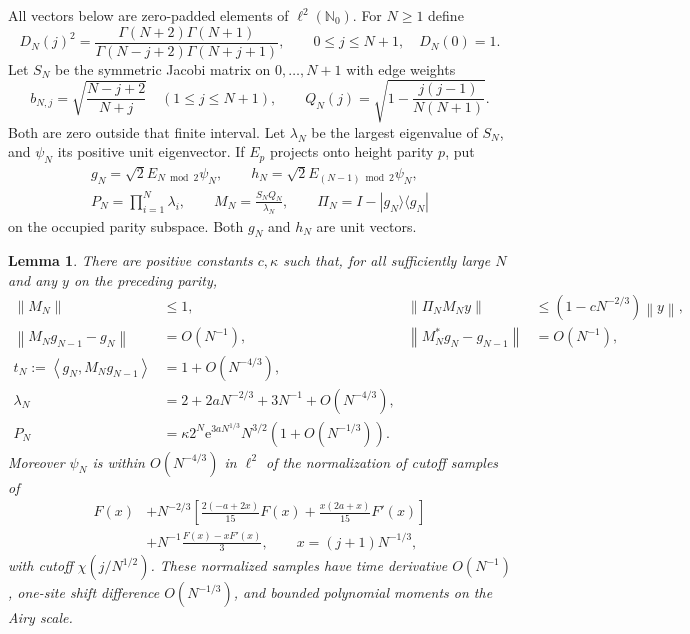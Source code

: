 \documentclass[11pt,letterpaper]{article}
\numberwithin{equation}{section}
\newtheorem{lemma}[theorem]{Lemma}
\theoremstyle{remark}
\newcommand{\norm}[1]{\left\lVert#1\right\rVert}
\newcommand{\ip}[2]{\left\langle#1,#2\right\rangle}
\newcommand{\N}{\mathbb{N}}
\newcommand{\ee}{\mathrm e}
\begin{document}
All vectors below are zero-padded elements of $\ell^2(\N_0)$. For $N\ge1$
define
\begin{equation}\label{air:cb:eq:gauge}
D_N(j)^2=\frac{\Gamma(N+2)\Gamma(N+1)}
{\Gamma(N-j+2)\Gamma(N+j+1)},\qquad 0\le j\le N+1,\quad D_N(0)=1.
\end{equation}
Let $S_N$ be the symmetric Jacobi matrix on $0,\ldots,N+1$ with edge
weights
\begin{equation}\label{air:cb:eq:S-Q}
b_{N,j}=\sqrt{\frac{N-j+2}{N+j}}\quad(1\le j\le N+1),\qquad
Q_N(j)=\sqrt{1-\frac{j(j-1)}{N(N+1)}}.
\end{equation}
Both are zero outside that finite interval. Let $\lambda_N$ be the largest
eigenvalue of $S_N$, and $\psi_N$ its positive unit eigenvector. If $E_p$
projects onto height parity $p$, put
\begin{equation}\label{air:cb:eq:ground-defs}
\begin{gathered}
g_N=\sqrt2 E_{N\bmod2}\psi_N,\qquad
h_N=\sqrt2 E_{(N-1)\bmod2}\psi_N,\\
P_N=\prod_{i=1}^N\lambda_i,\qquad M_N=\frac{S_NQ_N}{\lambda_N},\qquad
\Pi_N=I-|g_N\rangle\langle g_N|
\end{gathered}
\end{equation}
on the occupied parity subspace. Both $g_N$ and $h_N$ are unit vectors.

\begin{lemma}\label{air:cb:lem:jacobi}
There are positive constants $c,\kappa$ such that, for all sufficiently
large $N$ and any $y$ on the preceding parity,
\begin{equation}\label{air:cb:eq:jacobi-estimates}
\begin{aligned}
\norm{M_N}&\le1,&
\norm{\Pi_NM_Ny}&\le(1-cN^{-2/3})\norm y,\\
\norm{M_Ng_{N-1}-g_N}&=O(N^{-1}),&
\norm{M_N^*g_N-g_{N-1}}&=O(N^{-1}),\\
t_N:=\ip{g_N}{M_Ng_{N-1}}&=1+O(N^{-4/3}),\\
\lambda_N&=2+2aN^{-2/3}+3N^{-1}+O(N^{-4/3}),\\
P_N&=\kappa 2^N\ee^{3aN^{1/3}}N^{3/2}(1+O(N^{-1/3})).
\end{aligned}
\end{equation}
Moreover $\psi_N$ is within $O(N^{-4/3})$ in $\ell^2$ of the normalization
of cutoff samples of
\begin{equation}\label{air:cb:eq:finite-profile}
\begin{aligned}
F(x)&+N^{-2/3}\left[\frac{2(-a+2x)}{15}F(x)
+\frac{x(2a+x)}{15}F'(x)\right]\\
&+N^{-1}\frac{F(x)-xF'(x)}3,\qquad x=(j+1)N^{-1/3},
\end{aligned}
\end{equation}
with cutoff $\chi(j/N^{1/2})$. These normalized samples have time derivative
$O(N^{-1})$, one-site shift difference $O(N^{-1/3})$, and bounded polynomial
moments on the Airy scale.
\end{lemma}
\end{document}
